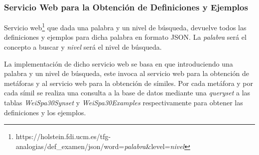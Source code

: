 \subsubsection{Servicio Web para la Obtención de Definiciones y Ejemplos}
\label{cap:subsec:sw_def_example}
Servicio web\footnote{https://holstein.fdi.ucm.es/tfg-analogias/def\_examen/json/word=\textit{palabra}\&level=\textit{nivel}} que dada una palabra y un nivel de búsqueda, devuelve todos las definiciones y ejemplos para dicha palabra en formato JSON. La \textit{palabra} será el concepto a buscar y \textit{nivel} será el nivel de búsqueda.

La implementación de dicho servicio web se basa en que introduciendo una palabra y un nivel de búsqueda, este invoca al servicio web para la obtención de metáforas y al servicio web para la obtención de símiles. Por cada metáfora y por cada símil se realiza una consulta a la base de datos mediante una \textit{queryset} a las tablas \textit{WeiSpa30Synset} y \textit{WeiSpa30Examples} respectivamente para obtener las definiciones y los ejemplos.


